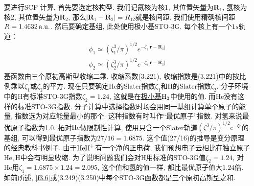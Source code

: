 要进行SCF
计算, 首先要选定核构型. 我们记氦核为核1, 其位置矢量为$\mathbf{R}_1$, 氢核为核2, 其位置矢量为$\mathbf{R}_2$, 那么$|\mathbf{R}_1-\mathbf{R}_2|=R_{12}$就是核间距. 我们使用精确核间距$R=1.4632\,\mathrm{a.u.}$. 然后要确定基组, 此处使用极小基STO-3G. 每个核上有一个$1s$轨道：
\begin{align}
\phi_1 \simeq (\zeta_1^3/\pi)^{1/2} e^{-\zeta_1|\mathbf{r-R}_1|}\\
\phi_2 \simeq (\zeta_2^3/\pi)^{1/2} e^{-\zeta_2|\mathbf{r-R}_1|}
\end{align}
基函数由三个原初高斯型收缩二乘, 收缩系数(3.221), 收缩指数是(3.221)中的按比例乘以$\zeta_1$或$\zeta_2$的平方. 现在只要确定$\mathrm{He}$的Slater指数$\zeta_1$和$\mathrm{H}$的Slater指数$\zeta_2$. 分子环境中的$\mathrm{H}$有标准STO-3G指数$\zeta_2=1.24$, 这就是在\underline{极小基$\mathrm{H}_2$}中使用的值. 而$\mathrm{He}$没有这样的标准STO-3G指数. 分子计算中选择指数时场会用同一基组计算单个原子的能量, 指数选为对应能量最小的那个. 这种指数有时叫作``最优原子''指数. 对氢来说最优原子指数为1.0. 拓对$\mathrm{He}$做限制性\hft 计算, 使用只含一个Slater轨道$(\zeta^3/\pi)^{1/2}e^{-\zeta r}$的基组, 可以得到最优原子指数为$27/16=1.6875$. 这个值(27/16)的推导是变分原理的经典教科书例子. 由于$\mathrm{HeH}^+$有一个净的正电荷, 我们预想电子云相比在独立原子$\mathrm{He,H}$中会有明显收缩. 为了说明问题我们会对$\mathrm{H}$用标准的STO-3G值$\zeta_2=1.24$, 对$\mathrm{He}$用$\zeta_1=1.6875\times 1.24=2.095$, 这个值和氢的值一样, 都比最优原子值大$1.24$倍. 如前所述, \ref{f3.6}或(3.249)(3.250)中每个STO-3G函数都是三个原初高斯型之和.

